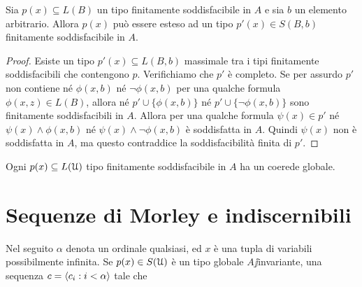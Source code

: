 \begin{lemma}
Sia $p(x)\subseteq L(B)$ un tipo finitamente soddisfacibile in $A$ e sia $b$ un elemento arbitrario. Allora $p(x)$ pu\`o essere esteso ad un tipo $p'(x)\in S(B,b)$ finitamente soddisfacibile in $A$.
\end{lemma}

\begin{proof} %

Esiste un tipo $p'(x)\subseteq L(B,b)$ massimale tra i tipi finitamente soddisfacibili che contengono $p$. Verifichiamo che $p'$ \`e completo. Se per assurdo $p'$ non contiene n\'e $\phi(x,b)$ n\'e $\neg\phi(x,b)$ per una qualche formula $\phi(x,z)\in L(B)$, allora n\'e $p'\cup\big\{\phi(x,b)\big\}$ n\'e $p'\cup\big\{\neg\phi(x,b)\big\}$ sono finitamente soddisfacibili in $A$. Allora per una qualche formula $\psi(x)\in p'$ n\'e $\psi(x)\wedge\phi(x,b)$ n\'e $\psi(x)\wedge\neg\phi(x,b)$ \`e soddisfatta in $A$. Quindi $\psi(x)$ non \`e soddisfatta in $A$, ma questo contraddice la soddisfacibilit\`a finita di $p'$.
\end{proof}

\begin{corollary}\label{coroll_esistenza_coeredi_globali}
Ogni $p(x)\subseteq L(\EuScript U)$ tipo finitamente soddisfacibile in $A$ ha un coerede globale.\QED
\end{corollary}

 
\section{Sequenze di Morley e indiscernibili}


Nel seguito $\alpha$ denota un ordinale qualsiasi, ed $x$ \`e una tupla di variabili possibilmente infinita. Se $p(x)\in S(\EuScript U)$ \`e un tipo globale $A\jj$invariante, una sequenza $c=\langle c_i:i<\alpha\rangle$ tale che



